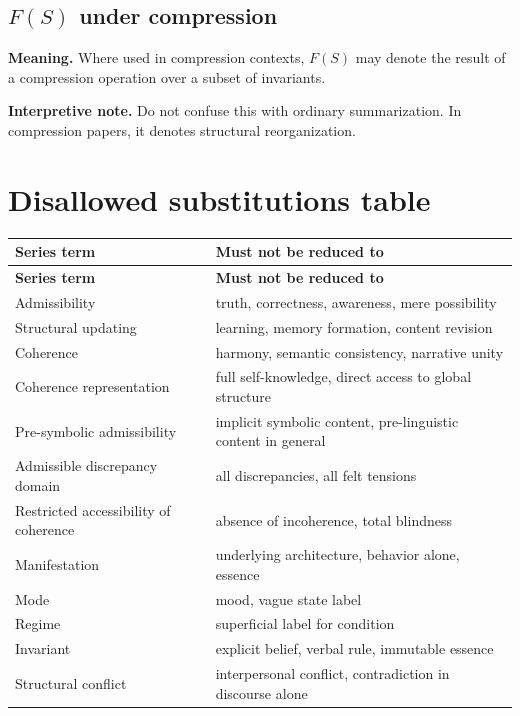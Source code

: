 \documentclass[11pt,a4paper]{article}
\begin{document}
	\subsection{$F(S)$ under compression}
	
	\textbf{Meaning.} Where used in compression contexts, $F(S)$ may denote the result of a compression operation over a subset of invariants.
	
	\textbf{Interpretive note.} Do not confuse this with ordinary summarization. In compression papers, it denotes structural reorganization.
	
	\section{Disallowed substitutions table}
	
	\begin{longtable}{>{\RaggedRight\arraybackslash}p{} >{\RaggedRight\arraybackslash}p{}}
		\toprule
		\textbf{Series term} & \textbf{Must not be reduced to} \\
		\midrule
		\endfirsthead
		\toprule
		\textbf{Series term} & \textbf{Must not be reduced to} \\
		\midrule
		\endhead
		Admissibility & truth, correctness, awareness, mere possibility \\
		Structural updating & learning, memory formation, content revision \\
		Coherence & harmony, semantic consistency, narrative unity \\
		Coherence representation & full self-knowledge, direct access to global structure \\
		Pre-symbolic admissibility & implicit symbolic content, pre-linguistic content in general \\
		Admissible discrepancy domain & all discrepancies, all felt tensions \\
		Restricted accessibility of coherence & absence of incoherence, total blindness \\
		Manifestation & underlying architecture, behavior alone, essence \\
		Mode & mood, vague state label \\
		Regime & superficial label for condition \\
		Invariant & explicit belief, verbal rule, immutable essence \\
		Structural conflict & interpersonal conflict, contradiction in discourse alone \\

\end{longtable}
\end{document}
